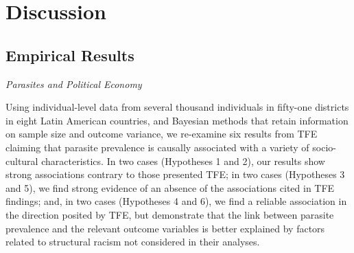 \documentclass[12pt]{article}
\begin{document}
\begin{figure}
{        \label{ALubWhitenessAndReligModel:first_sub}
    }     
\end{figure} 
 
\section{Discussion}
\subsection{Empirical Results}

\noindent\textit{Parasites and Political Economy}

	Using individual-level data from several thousand individuals in fifty-one districts in eight Latin American countries, and Bayesian methods that retain information on sample size and outcome variance, we re-examine six results from TFE claiming that parasite prevalence is causally associated with a variety of socio-cultural characteristics.  In two cases (Hypotheses 1 and 2), our results show strong associations contrary to those presented TFE; in two cases (Hypotheses 3 and 5), we find strong evidence of an absence of the associations cited in TFE findings; and, in two cases (Hypotheses 4 and 6), we find a reliable association in the direction posited by TFE, but demonstrate that the link between parasite prevalence and the relevant outcome variables is better explained by factors related to structural racism not considered in their analyses.  
	
\end{document}
